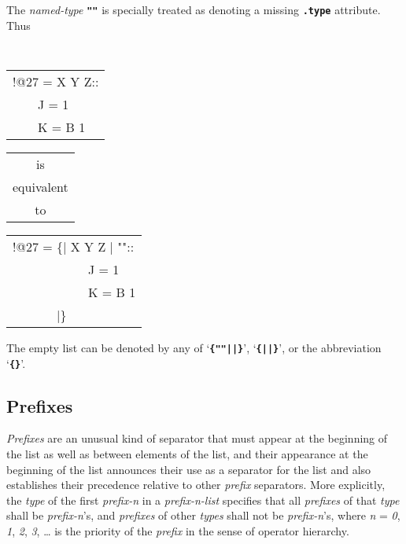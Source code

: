 \documentclass[12pt]{article}
\newcommand{\TT}[1]{{\tt \bfseries #1}}
\begin{document}
The {\em named-type} \TT{"{}"} is specially treated as denoting a missing
\TT{.type} attribute.  Thus
\begin{center}
\tt
\begin{tabular}{l}
!@27 = X Y Z:: \\
~~~~J = 1 \\
~~~~K = B 1 \\
\end{tabular}
\begin{tabular}{c}
\rm is \\
\rm equivalent \\
\rm to
\end{tabular}
\begin{tabular}{l}
!@27 = \{| X Y Z | "":: \\
~~~~~~~~~~~~J = 1 \\
~~~~~~~~~~~~K = B 1 \\
~~~~~~~|\} \\
\end{tabular}
\end{center}

The empty list can be denoted by any of `\TT{\{""||\}}', `\TT{\{||\}}',
or the abbreviation `\TT{\{\}}'.

\subsection{Prefixes}
\label{PREFIXES}

{\em Prefixes} are an unusual kind of separator
that must appear at the beginning of the list as well as between
elements of the list, and their appearance at the beginning of the list
announces their use as a separator for the list and also establishes their
precedence relative to other {\em prefix} separators.
More explicitly, the {\em type} of the first {\em prefix-n}
in a {\em prefix-n-list}
specifies that all {\em prefixes} of that {\em type} shall be {\em prefix-n}'s,
and {\em prefixes} of other {\em types} shall not be {\em prefix-n}'s,
where {\em n} = {\em 0}, {\em 1}, {\em 2}, {\em 3}, \ldots{}
is the priority of the {\em prefix} in the sense of operator
hierarchy.
\end{document}
